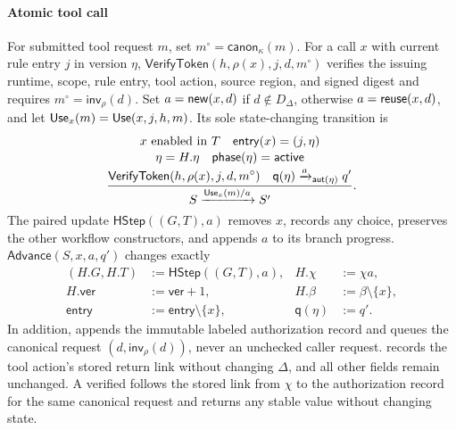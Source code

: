 \paragraph{Atomic tool call}
For submitted tool request \(m\), set \(m^\circ=\mathsf{canon}_\kappa(m)\).
For a call \(x\) with current rule entry \(j\) in version \(\eta\), \(\mathsf{VerifyToken}(h,\rho(x),j,d,m^\circ)\) verifies the issuing runtime, scope, rule entry, tool action, source region, and signed digest and requires \(m^\circ=\mathsf{inv}_\rho(d)\).
Set \(a=\mathsf{new}(x,d)\) if \(d\notin D_\Delta\), otherwise \(a=\mathsf{reuse}(x,d)\), and let \(\mathsf{Use}_x(m)=\mathsf{Use}(x,j,h,m)\).
Its sole state-changing transition is
\begin{equation}
\label{eq:use-rule}
\frac{
\begin{gathered}
 x\text{ enabled in }T\quad
 \mathsf{entry}(x)=(j,\eta)\\[-2pt]
 \eta=H.\eta\quad
 \mathsf{phase}(\eta)=\mathsf{active}\\[-2pt]
 \mathsf{VerifyToken}(h,\rho(x),j,d,m^\circ)\quad
 \mathsf q(\eta)\xrightarrow{a}_{\mathsf{aut}(\eta)}q'
\end{gathered}}
{S\xrightarrow{\mathsf{Use}_x(m)/a}S'} .
\end{equation}
The paired update \(\mathsf{HStep}((G,T),a)\) removes \(x\), records any choice, preserves the other workflow constructors, and appends \(a\) to its branch progress.
\(\mathsf{Advance}(S,x,a,q')\) changes exactly
\[
\begin{aligned}
 (H.G,H.T)&:=\mathsf{HStep}((G,T),a),&
 H.\chi&:=\chi a,\\
 H.\mathsf{ver}&:=\mathsf{ver}+1,& H.\beta&:=\beta\setminus\{x\},\\
 \mathsf{entry}&:=\mathsf{entry}\setminus\{x\},&
 \mathsf q(\eta)&:=q'.
\end{aligned}
\]
In addition, \Fresh appends the immutable labeled authorization record and queues the canonical request \((d,\mathsf{inv}_\rho(d))\), never an unchecked caller request.
\Alias records the tool action's stored return link without changing \(\Delta\), and all other fields remain unchanged.
A verified \Retry follows the stored link from \(\chi\) to the authorization record for the same canonical request and returns any stable value without changing state.

